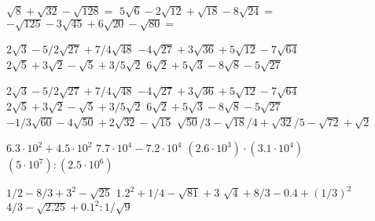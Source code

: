 \documentclass[12pt]{article}
\begin{document}
$\sqrt{8} + \sqrt{32} - \sqrt{128} =$
$5\sqrt{6} - 2\sqrt{12} + \sqrt{18} - 8\sqrt{24} =$
$-\sqrt{125} - 3\sqrt{45} + 6\sqrt{20} - \sqrt{80} =$

$2\sqrt{3} - 5/2\sqrt{27} + 7/4\sqrt{48}$
$-4\sqrt{27} + 3\sqrt{36} + 5\sqrt{12} - 7\sqrt{64}$
$2\sqrt{5} + 3\sqrt{2} - \sqrt{5} + 3/5\sqrt{2}$
$6\sqrt{2} + 5\sqrt{3} - 8\sqrt{8} - 5\sqrt{27}$

$2\sqrt{3} - 5/2\sqrt{27} + 7/4\sqrt{48}$
$-4\sqrt{27} + 3\sqrt{36} + 5\sqrt{12} - 7\sqrt{64}$
$2\sqrt{5} + 3\sqrt{2} - \sqrt{5} + 3/5\sqrt{2}$
$6\sqrt{2} + 5\sqrt{3} - 8\sqrt{8} - 5\sqrt{27}$
$-1/3\sqrt{60} - 4\sqrt{50} + 2\sqrt{32} - \sqrt{15}$
$\sqrt{50}/3 - \sqrt{18}/4 + \sqrt{32}/5 - \sqrt{72} + \sqrt{2}$

$6.3\cdot10^2 + 4.5\cdot10^2$
$7.7\cdot10^4 - 7.2\cdot10^4$
$(2.6\cdot10^3)\cdot(3.1\cdot10^4)$
$(5\cdot10^7):(2.5\cdot10^6)$

$1/2 - 8/3 +3^2 - \sqrt{25}$
$1.2^2 + 1/4 - \sqrt{81} + 3$
$\sqrt{4} + 8/3 - 0.4 + (1/3)^2$
$4/3 - \sqrt{2.25} + 0.1^2:1/\sqrt{9}$
\end{document}

